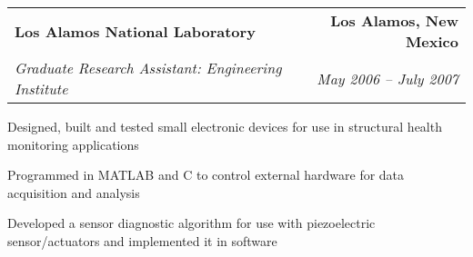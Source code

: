 \begin{tabular*}{6.6in}{@{\extracolsep{\fill}}lr}
\textbf{Los Alamos National Laboratory} & \textbf{Los Alamos, New Mexico}\\
\textit{Graduate Research Assistant: Engineering Institute} & \textit{May 2006 -- July 2007}
\end{tabular*}
\begin{compactitem} 
\item Designed, built and tested small electronic devices for use in structural health monitoring applications
\item Programmed in MATLAB and C to control external hardware for data acquisition and analysis 
\item Developed a sensor diagnostic algorithm for use with piezoelectric sensor/actuators and implemented it in software\medskip
\end{compactitem}